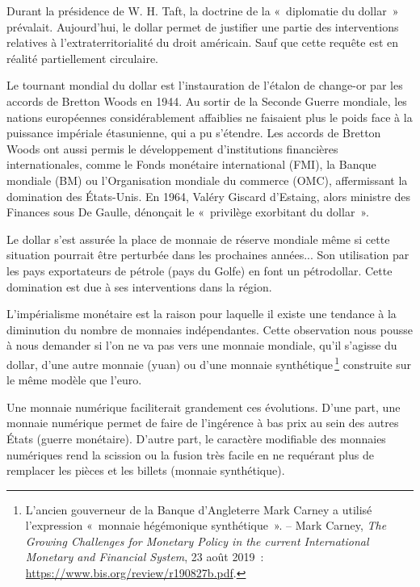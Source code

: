 \documentclass[a4paper,notitlepage]{article}
\newcommand{\eng}[1]{{\NoAutoSpaceBeforeFDP\emph{#1}}}  %
\newcommand{\sfootnote}{\,\footnote}
\begin{document}
Durant la présidence de W. H. Taft, la doctrine de la «~diplomatie du dollar~» prévalait. Aujourd'hui, le dollar permet de justifier une partie des interventions relatives à l'extraterritorialité du droit américain. Sauf que cette requête est en réalité partiellement circulaire.

Le tournant mondial du dollar est l'instauration de l'étalon de change-or par les accords de Bretton Woods en 1944. Au sortir de la Seconde Guerre mondiale, les nations européennes considérablement affaiblies ne faisaient plus le poids face à la puissance impériale étasunienne, qui a pu s'étendre. Les accords de Bretton Woods ont aussi permis le développement d'institutions financières internationales, comme le Fonds monétaire international (FMI), la Banque mondiale (BM) ou l'Organisation mondiale du commerce (OMC), affermissant la domination des États-Unis. En 1964, Valéry Giscard d'Estaing, alors ministre des Finances sous De Gaulle, dénonçait le «~privilège exorbitant du dollar~».

Le dollar s'est assurée la place de monnaie de réserve mondiale même si cette situation pourrait être perturbée dans les prochaines années... Son utilisation par les pays exportateurs de pétrole (pays du Golfe) en font un pétrodollar. Cette domination est due à ses interventions dans la région.


L'impérialisme monétaire est la raison pour laquelle il existe une tendance à la diminution du nombre de monnaies indépendantes. Cette observation nous pousse à nous demander si l'on ne va pas vers une monnaie mondiale, qu'il s'agisse du dollar, d'une autre monnaie (yuan) ou d'une monnaie synthétique\sfootnote{L'ancien gouverneur de la Banque d'Angleterre Mark Carney a utilisé l'expression «~monnaie hégémonique synthétique~». -- Mark Carney, \eng{The Growing Challenges for Monetary Policy in the current International Monetary and Financial System}, 23 août 2019~: \url{https://www.bis.org/review/r190827b.pdf}.} construite sur le même modèle que l'euro. %

Une monnaie numérique faciliterait grandement ces évolutions. D'une part, une monnaie numérique permet de faire de l'ingérence à bas prix au sein des autres États (guerre monétaire). D'autre part, le caractère modifiable des monnaies numériques rend la scission ou la fusion très facile en ne requérant plus de remplacer les pièces et les billets (monnaie synthétique).
\end{document}
